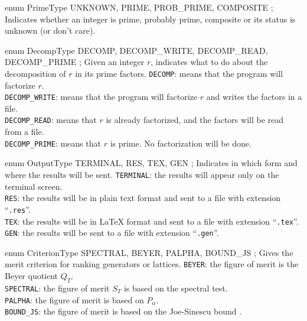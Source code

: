 {          
enum PrimeType { UNKNOWN, PRIME, PROB_PRIME, COMPOSITE };
\endcode
\tab
Indicates whether an integer is prime, probably prime, composite or its 
status is unknown (or don't care).
\endtab
\code

          
enum DecompType { DECOMP, DECOMP_WRITE, DECOMP_READ, DECOMP_PRIME };
\endcode
\tab
Given an integer $r$, indicates what to do about the decomposition of $r$ in
its prime factors.
\endtab
\tabb
 \texttt{DECOMP}: means that the program will factorize $r$.\\[1ex]
 \texttt{DECOMP\_WRITE}: means that the program will factorize $r$ and
    writes the factors in a file.\\[1ex]
 \texttt{DECOMP\_READ}: means that $r$ is already factorized, and
    the factors will be read from a file.\\[1ex]
 \texttt{DECOMP\_PRIME}: means that $r$ is prime. 
  No factorization will be done.
\endtabb
\code


enum OutputType { TERMINAL, RES, TEX, GEN };
\endcode
\tab
Indicates in which form and where the results will be sent. \label{co:output}
\endtab
\tabb
 \texttt{TERMINAL}: the results will appear only on the terminal screen.\\[1ex]
 \texttt{RES}: the results will be in plain text format and sent to a file with
 extension ``\texttt{.res}''.\\[1ex]
 \texttt{TEX}:  the results will be in \LaTeX{} format and sent to a file with
 extension ``\texttt{.tex}''.\\[1ex]
 \texttt{GEN}:  the results will be sent to a file with
 extension ``\texttt{.gen}''.
\endtabb
\code


enum CriterionType { SPECTRAL, BEYER, PALPHA, BOUND_JS };
\endcode
\tab
Gives the merit criterion for ranking generators or lattices.
\endtab
\tabb   \texttt{BEYER}: the figure of merit is the Beyer quotient $Q_T$.\\[1ex]
\texttt{SPECTRAL}: the figure of merit $S_T$ is based on the spectral test.\\[1ex]
\texttt{PALPHA}: the figure of merit is based on $P_\alpha$.\\[1ex]
\texttt{BOUND\_JS}: the figure of merit is based on the Joe-Sinescu bound
 \cite{rSIN08a}.
\endtabb
\code


}
